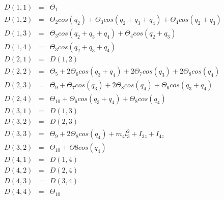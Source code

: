 \documentclass[letterpaper, 10 pt, journal, twocolumn]{IEEEtran}  %
\theoremstyle{plain}
\theoremstyle{definition}
\theoremstyle{remark}
\begin{document}
\begin{eqnarray}
	D(1,1) &=& \Theta_1\nonumber\\
	D(1,2) &=& \Theta_{2}cos(q_{2}) + \Theta_{3}cos(q_{2} + q_{3} + q_{4}) + \Theta_{4}cos(q_{2} + q_{3})\nonumber\\
	D(1,3) &=& \Theta_{3}cos(q_{2} + q_{3} + q_{4}) + \Theta_{4}cos(q_{2} + q_{3})\nonumber\\
	D(1,4) &=& \Theta_{3}cos(q_{2} + q_{3} + q_{4}) \nonumber \\
	D(2,1) &=& D(1,2)\nonumber \\
	D(2,2) &=& \Theta_{5} + 2\Theta_{6}cos(q_{3} + q_{4}) + 2\Theta_{7}cos(q_{3}) + 2\Theta_{8}cos(q_{4})\nonumber \\
	D(2,3) &=& \Theta_{9} + \Theta_{7}cos(q_{3}) + 2\Theta_{8}cos(q_{4}) + \Theta_{6}cos(q_{3} + q_{4})\nonumber \\
	D(2,4) &=& \Theta_{10} + \Theta_{6}cos(q_{3} + q_{4}) + \Theta_{8}cos(q_{4}) \nonumber \\
	D(3,1) &=& D(1,3)\nonumber \\
	D(3,2) &=& D(2,3)\nonumber \\
	D(3,3) &=& \Theta_{9} + 2\Theta_{8}cos(q_{4}) + m_{4}l_{3}^2 + I_{3z} + I_{4z} \nonumber \\
	D(3,2) &=& \Theta_{10} + \Theta{8}cos(q_{4}) \nonumber \\
	D(4,1) &=& D(1,4)\nonumber \\
	D(4,2) &=& D(2,4)\nonumber \\
	D(4,3) &=& D(3,4)\nonumber \\
	D(4,4) &=& \Theta_{10} \nonumber \\
	\label{eq:Inertia}
\end{eqnarray}
%
%
\end{document}
